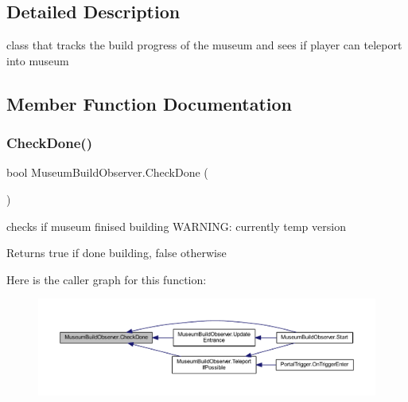 \subsection{Detailed Description}
class that tracks the build progress of the museum and sees if player can teleport into museum 



\subsection{Member Function Documentation}
\mbox{\label{class_museum_build_observer_a44742cfdf94ae34a329e689e6995075e}} 
\subsubsection{\texorpdfstring{Check\+Done()}{CheckDone()}}
{\footnotesize\ttfamily bool Museum\+Build\+Observer.\+Check\+Done (\begin{DoxyParamCaption}{ }\end{DoxyParamCaption})}



checks if museum finised building W\+A\+R\+N\+I\+NG\+: currently temp version 

\begin{DoxyReturn}{Returns}
true if done building, false otherwise
\end{DoxyReturn}
Here is the caller graph for this function\+:
\nopagebreak
\begin{figure}[H]
\begin{center}
\leavevmode
\includegraphics[width=350pt]{class_museum_build_observer_a44742cfdf94ae34a329e689e6995075e_icgraph}
\end{center}
\end{figure}
\mbox{\label{class_museum_build_observer_a4bd33ad4fee577f34f861c4d92d8bff4}} 

